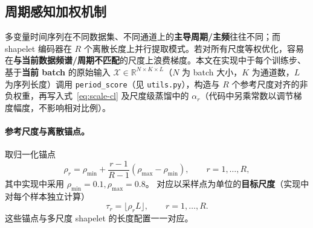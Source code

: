 \documentclass{article}
\begin{document}
\subsection{周期感知加权机制}
\label{sec:period-score}

多变量时间序列在不同数据集、不同通道上的\textbf{主导周期/主频}往往不同；而 shapelet 编码器在 $R$ 个离散长度上并行提取模式。若对所有尺度等权优化，容易在\textbf{与当前数据频谱/周期不匹配}的尺度上浪费梯度。本文在实现中于每个训练步、基于\textbf{当前 batch} 的原始输入 $\mathcal{X}\in\mathbb{R}^{N\times K\times L}$（$N$ 为 batch 大小，$K$ 为通道数，$L$ 为序列长度）调用 \texttt{period\_score}（见 \texttt{utils.py}），构造与 $R$ 个参考尺度对齐的非负权重，再写入式~\eqref{eq:scale-cl} 及尺度级蒸馏中的 $\alpha_r$（代码中另乘常数以调节梯度幅度，不影响相对比例）。

\paragraph{参考尺度与离散锚点。}
取归一化锚点
\begin{equation}
\rho_r=\rho_{\min}+\frac{r-1}{R-1}\left(\rho_{\max}-\rho_{\min}\right),
\qquad r=1,\ldots,R,
\end{equation}
其中实现中采用 $\rho_{\min}=0.1,\rho_{\max}=0.8$。
对应以采样点为单位的\textbf{目标尺度}（实现中对每个样本独立计算）
\begin{equation}
\tau_r=\bigl\lfloor \rho_r L \bigr\rfloor,\qquad r=1,\ldots,R.
\end{equation}
这些锚点与多尺度 shapelet 的长度配置一一对应。
\end{document}
